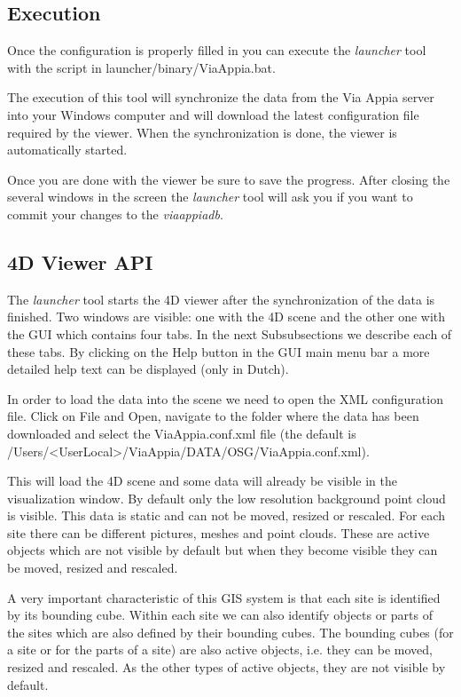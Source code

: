 \documentclass[a4paper,11pt]{article}
\begin{document}
\subsection{Execution}

Once the configuration is properly filled in you can execute the \textit{launcher} tool with the script in launcher/binary/ViaAppia.bat. 

The execution of this tool will synchronize the data from the Via Appia server into your Windows computer and will download the latest configuration file required by the viewer.
When the synchronization is done, the viewer is automatically started. 

Once you are done with the viewer be sure to save the progress. After closing the several windows in the screen the \textit{launcher} tool will ask you if you want to commit your changes to the \textit{viaappiadb}.

\subsection{4D Viewer API}

The \textit{launcher} tool starts the 4D viewer after the synchronization of the data is finished. Two windows are visible: one with the 4D scene and the other one with the GUI which contains four tabs. In the next Subsubsections we describe each of these tabs. By clicking on the Help button in the GUI main menu bar a more detailed help text can be displayed (only in Dutch). 

In order to load the data into the scene we need to open the XML configuration file. Click on File and Open, navigate to the folder where the data has been downloaded and select the ViaAppia.conf.xml file (the default is /Users/\textless{}UserLocal\textgreater{}/ViaAppia/DATA/OSG/ViaAppia.conf.xml).

This will load the 4D scene and some data will already be visible in the visualization window. By default only the low resolution background point cloud is visible. This data is static and can not be moved, resized or rescaled. For each site there can be different pictures, meshes and point clouds. These are active objects which are not visible by default but when they become visible they can be moved, resized and rescaled.

A very important characteristic of this GIS system is that each site is identified by its bounding cube. Within each site we can also identify objects or parts of the sites which are also defined by their bounding cubes. The bounding cubes (for a site or for the parts of a site) are also active objects, i.e. they can be moved, resized and rescaled. As the other types of active objects, they are not visible by default.
\end{document}
